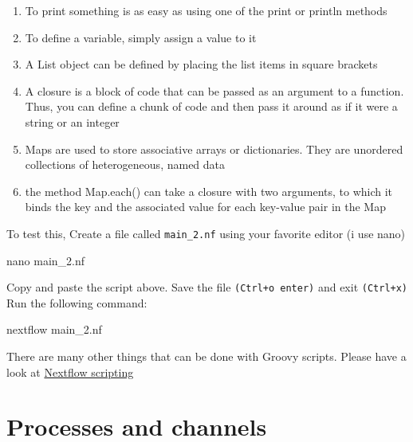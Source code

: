 \documentclass[
]{book}
\newenvironment{Shaded}{\begin{snugshade}}{\end{snugshade}}
\newcommand{\ExtensionTok}[1]{#1}
\newcommand{\FunctionTok}[1]{\textcolor[rgb]{0.00,0.00,0.00}{#1}}
\newcommand{\NormalTok}[1]{#1}
\providecommand{\tightlist}{%
  \setlength{\itemsep}{0pt}\setlength{\parskip}{0pt}}
\begin{document}
\begin{enumerate}
\def\labelenumi{\arabic{enumi}.}
\tightlist
\item
  To print something is as easy as using one of the print or println methods
\item
  To define a variable, simply assign a value to it
\item
  A List object can be defined by placing the list items in square brackets
\item
  A closure is a block of code that can be passed as an argument to a function. Thus, you can define a chunk of code and then pass it around as if it were a string or an integer
\item
  Maps are used to store associative arrays or dictionaries. They are unordered collections of heterogeneous, named data
\item
  the method Map.each() can take a closure with two arguments, to which it binds the key and the associated value for each key-value pair in the Map
\end{enumerate}

To test this, Create a file called \texttt{main\_2.nf} using your favorite editor (i use nano)

\begin{Shaded}
\begin{Highlighting}[numbers=left,,]
\FunctionTok{nano}\NormalTok{ main\_2.nf}
\end{Highlighting}
\end{Shaded}

Copy and paste the script above. Save the file \texttt{(Ctrl+o\ enter)} and exit \texttt{(Ctrl+x)}
Run the following command:

\begin{Shaded}
\begin{Highlighting}[numbers=left,,]
\ExtensionTok{nextflow}\NormalTok{ main\_2.nf}
\end{Highlighting}
\end{Shaded}

There are many other things that can be done with Groovy scripts. Please have a look at \href{https://www.nextflow.io/docs/latest/script.html\#}{Nextflow scripting}

\hypertarget{processes-and-channels}{%
\section{Processes and channels}\label{processes-and-channels}}
\end{document}
